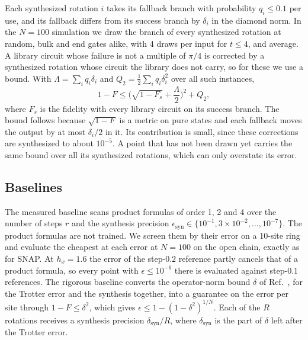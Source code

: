 Each synthesized rotation $i$ takes its fallback branch with probability $q_i \leq 0.1$ per use, and its fallback differs from its success branch by $\delta_i$ in the diamond norm. In the $N = 100$ simulation we draw the branch of every synthesized rotation at random, bulk and end gates alike, with 4 draws per input for $t \leq 4$, and average. A library circuit whose failure is not a multiple of $\pi/4$ is corrected by a synthesized rotation whose circuit the library does not carry, so for these we use a bound. With $\Lambda = \sum_i q_i \delta_i$ and $Q_2 = \tfrac12 \sum_i q_i \delta_i^{2}$ over all such instances,
\begin{equation}
1 - F \leq \Big( \sqrt{1 - F_s} + \frac{\Lambda}{2} \Big)^{2} + Q_2 ,
\label{eq:te_fallback_bound}
\end{equation}
where $F_s$ is the fidelity with every library circuit on its success branch. The bound follows because $\sqrt{1 - F}$ is a metric on pure states and each fallback moves the output by at most $\delta_i/2$ in it. Its contribution is small, since these corrections are synthesized to about $10^{-5}$. A point that has not been drawn yet carries the same bound over all its synthesized rotations, which can only overstate its error.

\subsection{Baselines}

The measured baseline scans product formulas of order 1, 2 and 4 over the number of steps $r$ and the synthesis precision $\epsilon_{\mathrm{syn}} \in \{10^{-1}, 3 \times 10^{-2}, \dots, 10^{-7}\}$. The product formulas are not trained. We screen them by their error on a 10-site ring and evaluate the cheapest at each error at $N = 100$ on the open chain, exactly as for SNAP. At $h_x = 1.6$ the error of the step-$0.2$ reference partly cancels that of a product formula, so every point with $\epsilon \leq 10^{-6}$ there is evaluated against step-$0.1$ references. The rigorous baseline converts the operator-norm bound $\delta$ of Ref.~\cite{Liu2026}, for the Trotter error and the synthesis together, into a guarantee on the error per site through $1 - F \leq \delta^{2}$, which gives $\epsilon \leq 1 - (1 - \delta^{2})^{1/N}$. Each of the $R$ rotations receives a synthesis precision $\delta_{\mathrm{syn}}/R$, where $\delta_{\mathrm{syn}}$ is the part of $\delta$ left after the Trotter error.
